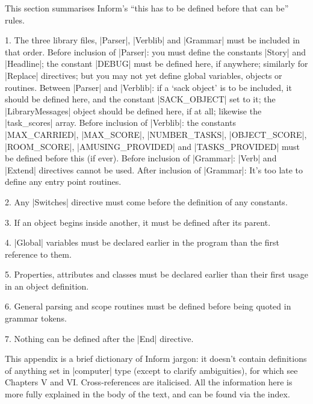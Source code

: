 {{{%
This section summarises Inform's ``this has to be defined before
that can be'' rules.
\smallskip
\item{1.} The three library files, |Parser|, |Verblib| and |Grammar| must be
included in that order.
\smallskip
{} Before inclusion of |Parser|: you must define the constants
|Story| and |Headline|; the constant |DEBUG| must be defined here, if
anywhere; similarly for |Replace| directives; but you may not yet define global
variables, objects or routines.
 Between |Parser| and |Verblib|: if a `sack object' is
to be included, it should be defined here, and the constant |SACK_OBJECT|
set to it; the |LibraryMessages| object should be defined here, if at
all; likewise the |task_scores| array.
 Before inclusion of |Verblib|: the constants
\begindisplay
\qquad |MAX_CARRIED|, |MAX_SCORE|, |NUMBER_TASKS|, |OBJECT_SCORE|,\cr
\qquad |ROOM_SCORE|, |AMUSING_PROVIDED| and |TASKS_PROVIDED|\cr
\enddisplay
must be defined before this (if ever).
 Before inclusion of |Grammar|: |Verb| and |Extend| directives
cannot be used.
 After inclusion of |Grammar|: It's too late to define any
entry point routines.

\smallskip
\item{2.} Any |Switches| directive must come before the definition of any
constants.
\item{3.} If an object begins inside another, it must be defined after its
parent.
\item{4.} |Global| variables must be declared earlier in the
program than the first reference to them.
\item{5.} Properties, attributes and classes must be declared earlier than
their first usage in an object definition.
\item{6.} General parsing and scope routines must be defined before being quoted
in grammar tokens.
\item{7.} Nothing can be defined after the |End| directive.


\vfill\eject\lexicontrue{}
%

%
This appendix is a brief dictionary of Inform jargon: it doesn't contain
definitions of anything set in |computer| type (except to clarify
ambiguities), for which see Chapters V and VI.  Cross-references
are italicised.  All the information here is more fully explained in the
body of the text, and can be found via the index.

}}}
